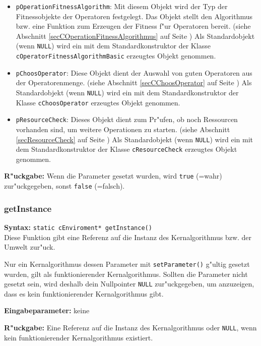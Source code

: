 \begin{itemize}
 \item \verb|pOperationFitnessAlgorithm|: Mit diesem Objekt wird der Typ der Fitnessobjekte der Operatoren festgelegt. Das Objekt stellt den Algorithmus bzw. eine Funktion zum Erzeugen der Fitness f"ur Operatoren bereit.
(siehe Abschnitt \ref{secCOperationFitnessAlgorithmus} auf Seite \pageref{secCOperationFitnessAlgorithmus}) Als Standardobjekt (wenn \verb|NULL|) wird ein mit dem Standardkonstruktor der Klasse \verb|cOperatorFitnessAlgorithmBasic| erzeugtes Objekt genommen.
 \item \verb|pChoosOperator|:  Diese Objekt dient der Auswahl von guten Operatoren aus der Operatorenmenge. (siehe Abschnitt \ref{secCChoosOperator} auf Seite \pageref{secCChoosOperator}) Als Standardobjekt (wenn \verb|NULL|) wird ein mit dem Standardkonstruktor der Klasse \verb|cChoosOperator| erzeugtes Objekt genommen.
 \item \verb|pResourceCheck|: Dieses Objekt dient zum Pr"ufen, ob noch Ressourcen vorhanden sind, um weitere Operationen zu starten. (siehe Abschnitt \ref{secResourceCheck} auf Seite \pageref{secResourceCheck}) Als Standardobjekt (wenn \verb|NULL|) wird ein mit dem Standardkonstruktor der Klasse \verb|cResourceCheck| erzeugtes Objekt genommen.
\end{itemize}

\bigskip\noindent
\textbf{R"uckgabe:} Wenn die Parameter gesetzt wurden, wird \verb|true| (=wahr) zur"uckgegeben, sonst \verb|false| (=falsch).


\subsubsection{getInstance}

\textbf{Syntax:} \verb|static cEnviroment* getInstance()| \\

Diese Funktion gibt eine Referenz auf die Instanz des Kernalgorithmus bzw. der Umwelt zur"uck.

Nur ein Kernalgorithmus dessen Parameter mit \verb|setParameter()| g"ultig gesetzt wurden, gilt als funktionierender Kernalgorithmus. Sollten die Parameter nicht gesetzt sein, wird deshalb dein Nullpointer \verb|NULL| zur"uckgegeben, um anzuzeigen, dass es kein funktionierender Kernalgorithmus gibt.


\bigskip\noindent
\textbf{Eingabeparameter:} keine

\bigskip\noindent
\textbf{R"uckgabe:} Eine Referenz auf die Instanz des Kernalgorithmus oder \verb|NULL|, wenn kein funktionierender Kernalgorithmus existiert.


